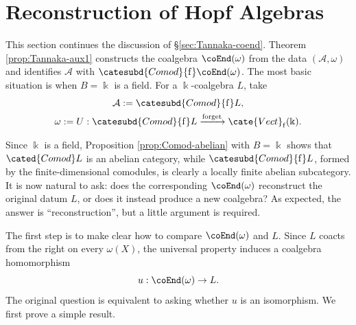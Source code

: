 
\section{Reconstruction of Hopf Algebras}\label{sec:Hopf-reconstruction}
This section continues the discussion of \S\ref{sec:Tannaka-coend}. Theorem
\ref{prop:Tannaka-aux1} constructs the coalgebra $\coEnd(\omega)$ from the
data $(\mathcal{A}, \omega)$ and identifies $\mathcal{A}$ with
$\catesubd{Comod}{\mathrm{f}}\coEnd(\omega)$. The most basic situation is
when $B = \Bbbk$ is a field. For a $\Bbbk$-coalgebra $L$, take
\begin{gather*}
	\mathcal{A} := \catesubd{Comod}{\mathrm{f}}L , \\
	\omega := U: \catesubd{Comod}{\mathrm{f}}L \xrightarrow{\text{forget}} \cate{Vect}_{\mathrm{f}}(\Bbbk).
\end{gather*}

Since $\Bbbk$ is a field, Proposition \ref{prop:Comod-abelian} with
$B = \Bbbk$ shows that $\cated{Comod}L$ is an abelian category, while
$\catesubd{Comod}{\mathrm{f}}L$, formed by the finite-dimensional comodules,
is clearly a locally finite abelian subcategory. It is now natural to ask:
does the corresponding $\coEnd(\omega)$ reconstruct the original datum $L$,
or does it instead produce a new coalgebra? As expected, the answer is
``reconstruction'', but a little argument is required.

The first step is to make clear how to compare $\coEnd(\omega)$ and $L$.
Since $L$ coacts from the right on every $\omega(X)$, the universal property
induces a coalgebra homomorphism
\begin{equation}\label{eqn:u-comparison}
	u: \coEnd(\omega) \to L.
\end{equation}
The original question is equivalent to asking whether $u$ is an isomorphism.
We first prove a simple result.

